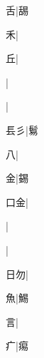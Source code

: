 \begin{multicols}{2}
{{\cjk{}{\cnsym{}　}{\cnsym{}　}舌}|{\cjk{}舓}\par
{\cjk{}{\cnsym{}　}{\cnsym{}　}禾}|{}\par
{\cjk{}{\cnsym{}　}{\cnsym{}　}丘}|{}\par
{}|{}\par
{}|{}\par
{\cjk{}{\cnsym{}　}镸彡}|{\cjk{}鬄}\par
{八}|{}\par
{\cjk{}{\cnsym{}　}{\cnsym{}　}金}|{\cjk{}錫}\par
{\cjk{}{\cnsym{}　}口金}|{}\par
{}|{}\par
{}|{}\par
{\cjk{}{\cnsym{}　}日勿}|{}\par
{\cjk{}{\cnsym{}　}{\cnsym{}　}魚}|{\cjk{}鯣}\par
{\cjk{}{\cnsym{}　}{\cnsym{}　}言}|{}\par
{\cjk{}{\cnsym{}　}{\cnsym{}　}疒}|{\cjk{}痬}\par
}
\end{multicols}
